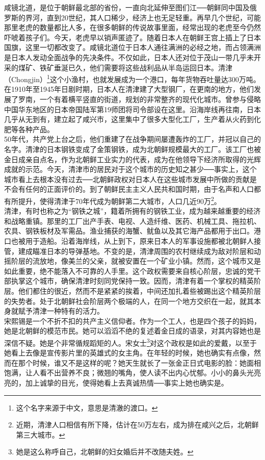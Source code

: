 咸镜北道，是位于朝鲜最北部的省份，一直向北延伸至图们江──朝鲜同中国及俄罗斯的界河，直到20世纪，其人口稀少，经济上也无足轻重。再早几个世纪，可能那里老虎的数量都比人多，在很多朝鲜的传说故事里面，经常出现的老虎至今仍然吓唬着孩子们。今天，老虎早以销声匿迹了。随着日本人在朝鲜王宫上插上了日本国旗，这里一切都改变了。咸镜北道位于日本人通往满洲的必经之地，而占领满洲是日本人发动全面战争的先决条件。不仅如此，日本人还对位于茂山一带几乎未开采的煤矿、铁矿垂涎已久，他们需要将这些战利品从半岛运回日本。清津（Chongjin）\footnote{这个名字来源于中文，意思是清澈的渡口。}这个小渔村，也就发展成为一个港口，每年货物吞吐量达300万吨。在1910年至1945年日剧时期，日本人在清津建了大型钢厂，在更南的地方，他们发展了罗南，一个有着横平竖直的街道，规划的非常整齐的现代化城市。曾参与侵略中国华东地区的日本帝国陆军第19师团将司令部设在这里。沿海岸线再往南，日本几乎从无到有，建立起了咸兴市，这里集中了很多大型化工厂，生产着从火药到化肥等各种产品。\\

50年代，共产党上台之后，他们重建了在战争期间屡遭轰炸的工厂，并冠以自己的名字。清津的日本钢铁变成了金策钢铁，成为北朝鲜规模最大的工厂。该工厂也被金日成亲自点名，作为北朝鲜工业实力的代表，成为在他领导下经济所取得的光辉成就的示范。今天，清津市的居民对于这个城市的历史知之甚少──事实上，这个城市看上去根本没有过去──北朝鲜政权对日本人在这些城市发展中所做的贡献是不会有任何的正面评价的。到了朝鲜民主主义人民共和国时期，由于名声和人口都有所提升，使得清津于70年代成为朝鲜第二大城市，人口几近90万\footnote{近期，清津人口相信有所下降，估计在50万左右，成为排在咸兴之后，北朝鲜第三大城市。}。\\

清津，有时也称之为“钢铁之城”，籍着所拥有的钢铁工业，成为越来越重要的经济和战略重镇。那里的工厂出产手表、电视、人造纤维、医药、机械工具、拖拉机、农具、钢铁板材及军需品。渔业捕获的海蟹、鱿鱼以及其它海产品都用于出口。港口也被用于造船。沿着海岸线，从上到下，原来日本人的军事设施都被北朝鲜人接管，建成瞄准日本的导弹基地。不变的是，清津周围的农村继续成为敌对阶层和动摇阶层的流放地，像美兰的父亲，就被安置在一个矿业小镇。然而，这个城市又是如此重要，绝不能落入不可靠的人手里。这个政权需要来自核心阶层，忠诚的党干部执掌这个城市，确保清津时刻同党保持一致。因而，清津有着一个掌权的精英阶层。他们都住的很近，然而不是紧紧的挨着，中间还加扎着些被踢出这个精英阶层的失势者。处于北朝鲜社会阶层两个极端的人，在同一个地方交织在一起，就其本身就赋予清津一种特有的活力。\\

宋熙锡是一个不折不扣的共产主义信仰者。作为一个工人，也是四个孩子的妈妈，她是北朝鲜的模范市民。她可以滔滔不绝的复述着金日成的语录，对其内容她也是深信不疑。她是个非常循规蹈矩的人。宋女士\footnote{她是这么称呼自己，北朝鲜的妇女婚后并不改随夫姓。}对这个政权是如此的爱戴，以至于她看上去像是宣传影片里的英雄式的女主角。在年轻的时候，她也确实有点像，然而在那个时候，谁又不是这样的呢？她天生就长了一张金正日式电影的脸：她面相饱满，让人看不出营养不良；微翘的嘴角，使人读不出内心忧郁。小小的鼻头光亮亮的，加上诚挚的目光，使得她看上去真诚热情──事实上她也确实是。\\

